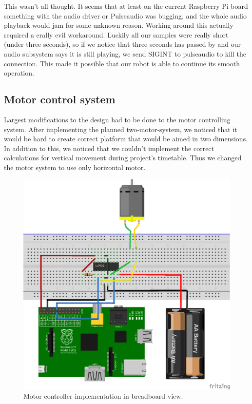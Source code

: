\documentclass[english,11pt,twoside,a4paper]{article}
\begin{document}
This wasn't all thought. It seems that at least on the current Raspberry Pi board something with the audio driver or Pulseaudio was bugging, and the whole audio playback would jam for some unknown reason. Working around this actually required a erally evil workaround. Luckily all our samples were really short (under three seconds), so if we notice that three seconds has passed by and our audio subsystem says it is still playing, we send SIGINT to pulseaudio to kill the connection. This made it possible that our robot is able to continue its smooth operation.

\subsection{Motor control system}

Largest modifications to the design had to be done to the motor controlling system. After implementing the planned two-motor-system, we noticed that it would be hard to create correct platform that would be aimed in two dimensions. In addition to this, we noticed that we couldn't implement the correct calculations for vertical movement during project's timetable. Thus we changed the motor system to use only horizontal motor.

\begin{figure}
  \begin{center}
    \includegraphics[scale=0.75]{motor_controllers_l293d_impl_bb.png}
    \caption{Motor controller implementation in breadboard view.}
  \end{center}
  \label{l293d_bb_impl}
\end{figure}
\end{document}
